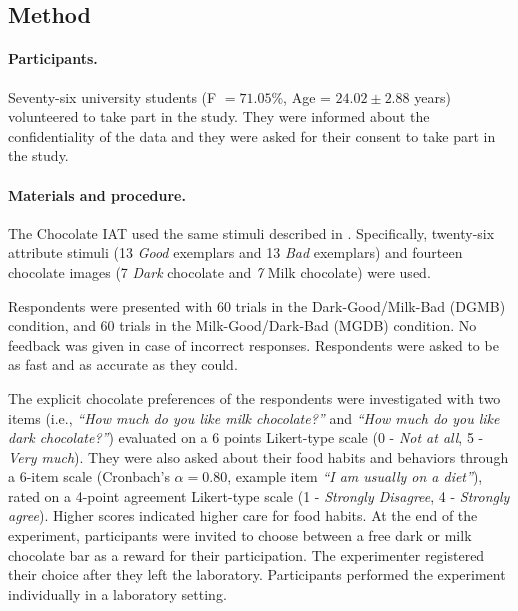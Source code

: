 \documentclass[12pt]{book}
\begin{document}
\subsection{Method}

\paragraph{Participants.}
Seventy-six university students (F $=71.05$\%, Age = $24.02\pm2.88$ years) volunteered to take part in the study. 
They were informed about the confidentiality of the data and they were asked for their consent to take part in the study. 


\paragraph{Materials and procedure.}
The Chocolate IAT used the same stimuli described in . Specifically, twenty-six attribute stimuli (13 \emph{Good} exemplars and 13 \emph{Bad} exemplars) and fourteen chocolate images (7 \emph{Dark} chocolate and \emph{7} Milk chocolate) were used. 


Respondents were presented with 60 trials in the Dark-Good/Milk-Bad (DGMB) condition, and 60 trials in the Milk-Good/Dark-Bad (MGDB) condition. 
No feedback was given in case of incorrect responses. 
Respondents were asked to be as fast and as accurate as they could.

The explicit chocolate preferences of the respondents were investigated with two items (i.e., \textit{``How much do you like milk chocolate?''} and \textit{``How much do you like dark chocolate?''}) evaluated on a 6 points Likert-type scale (0 - \emph{Not at all}, 5 - \emph{Very much}). 
They were also asked about their food habits and behaviors through a 6-item scale (Cronbach's $\alpha = 0.80$, example item \textit{``I am usually on a diet''}), rated on a 4-point agreement Likert-type scale (1 - \emph{Strongly Disagree}, 4 - \emph{Strongly agree}). Higher scores indicated higher care for food habits. 
At the end of the experiment, participants were invited to choose between a free dark or milk chocolate bar as a reward for their participation. 
The experimenter registered their choice after they left the laboratory.
Participants performed the experiment individually in a laboratory setting.
\end{document}
